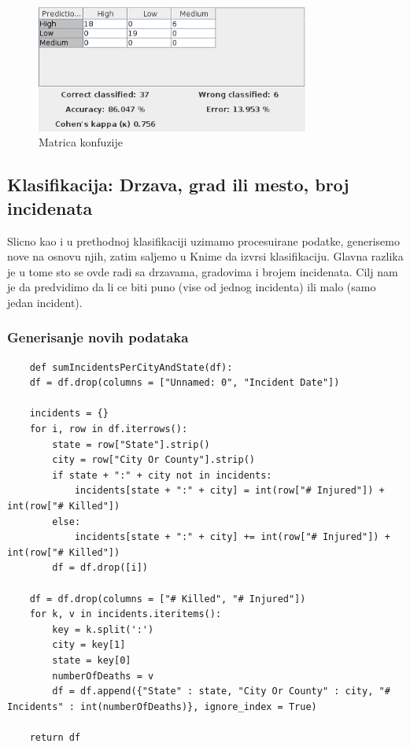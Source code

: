 \documentclass[11pt]{article} %
\begin{document}
	\begin{figure}[h!]
        \includegraphics[width=0.8\textwidth]{matricaKonfuzije}
        \caption{Matrica konfuzije}
	\end{figure}
	
	\subsection{Klasifikacija: Drzava, grad ili mesto, broj incidenata}
	Slicno kao i u prethodnoj klasifikaciji uzimamo procesuirane podatke, generisemo nove na osnovu njih, zatim saljemo u Knime da izvrsi klasifikaciju. 
	Glavna razlika je u tome sto se ovde radi sa drzavama, gradovima i brojem incidenata. Cilj nam je da predvidimo da li ce biti 
	puno (vise od jednog incidenta) ili malo (samo jedan incident).
	
	\subsubsection{Generisanje novih podataka}
	\begin{lstlisting}
	def sumIncidentsPerCityAndState(df):
	df = df.drop(columns = ["Unnamed: 0", "Incident Date"])

	incidents = {}
	for i, row in df.iterrows():
		state = row["State"].strip()
		city = row["City Or County"].strip()
		if state + ":" + city not in incidents:
			incidents[state + ":" + city] = int(row["# Injured"]) + int(row["# Killed"])
		else:
			incidents[state + ":" + city] += int(row["# Injured"]) + int(row["# Killed"])
		df = df.drop([i])

	df = df.drop(columns = ["# Killed", "# Injured"])
	for k, v in incidents.iteritems():
		key = k.split(':')
		city = key[1]
		state = key[0]
		numberOfDeaths = v
		df = df.append({"State" : state, "City Or County" : city, "# Incidents" : int(numberOfDeaths)}, ignore_index = True)

	return df
	\end{lstlisting}
	
\end{document}
